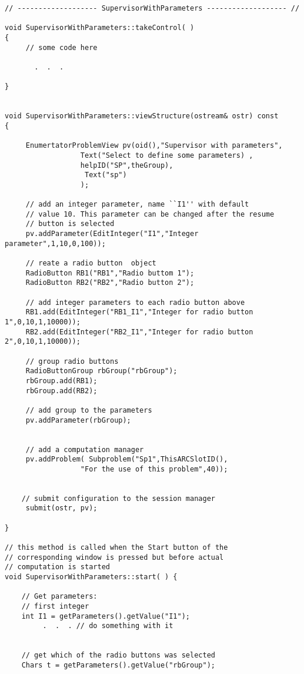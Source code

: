 \documentclass[12pt]{article}
\begin{document}
    \footnotesize
    \begin{verbatim}
// ------------------- SupervisorWithParameters ------------------- //

void SupervisorWithParameters::takeControl( )
{
     // some code here

       .  .  .

}


void SupervisorWithParameters::viewStructure(ostream& ostr) const
{

     EnumertatorProblemView pv(oid(),"Supervisor with parameters",
                  Text("Select to define some parameters) ,
                  helpID("SP",theGroup),
                   Text("sp")
                  );

     // add an integer parameter, name ``I1'' with default
     // value 10. This parameter can be changed after the resume
     // button is selected
     pv.addParameter(EditInteger("I1","Integer parameter",1,10,0,100));

     // reate a radio button  object
     RadioButton RB1("RB1","Radio buttom 1");
     RadioButton RB2("RB2","Radio button 2");

     // add integer parameters to each radio button above
     RB1.add(EditInteger("RB1_I1","Integer for radio button 1",0,10,1,10000));
     RB2.add(EditInteger("RB2_I1","Integer for radio button 2",0,10,1,10000));

     // group radio buttons
     RadioButtonGroup rbGroup("rbGroup");
     rbGroup.add(RB1);
     rbGroup.add(RB2);

     // add group to the parameters
     pv.addParameter(rbGroup);


     // add a computation manager
     pv.addProblem( Subproblem("Sp1",ThisARCSlotID(),
                  "For the use of this problem",40));


    // submit configuration to the session manager
     submit(ostr, pv);

}

// this method is called when the Start button of the
// corresponding window is pressed but before actual
// computation is started
void SupervisorWithParameters::start( ) {

    // Get parameters:
    // first integer
    int I1 = getParameters().getValue("I1");
         .  .  . // do something with it


    // get which of the radio buttons was selected
    Chars t = getParameters().getValue("rbGroup");


\end{verbatim}
\end{document}
